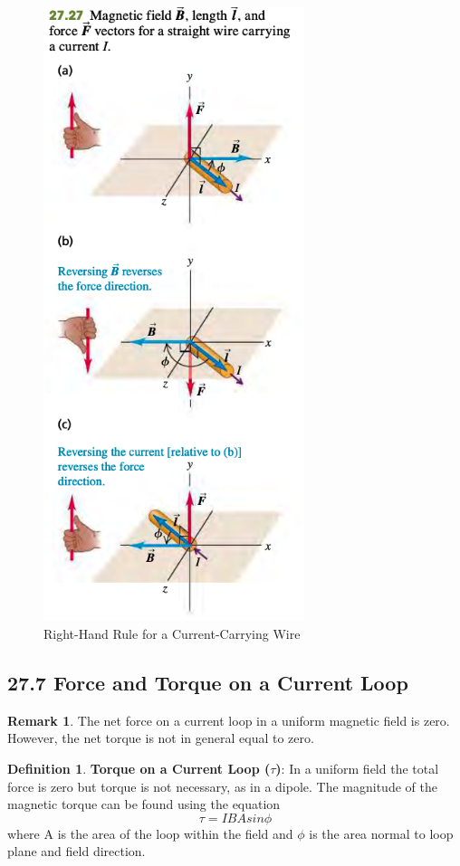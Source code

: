 \documentclass[12pt]{amsart}
\theoremstyle{definition}
\newtheorem{definition}{Definition} %
\newtheorem*{remark}{Remark}        %
\numberwithin{equation}{theorem}    %
\begin{document}
\begin{figure}[H]
    \centering
    \includegraphics[width=3in]{Media/wirerhr.png}
    \caption{Right-Hand Rule for a Current-Carrying Wire}
    \label{Right-Hand Rule for a Current-Carrying Wire}
\end{figure}

\subsection*{27.7 Force and Torque on a Current Loop}
\begin{remark}
    The net force on a current loop in a uniform magnetic field is zero. However, the net torque is not in general equal to zero.
\end{remark}

\begin{definition}
    \textbf{Torque on a Current Loop ($\tau$)}:
    In a uniform field the total force is zero but torque is not necessary, as in a dipole. The magnitude of the magnetic torque can be found using the equation $$\tau = IBAsin\phi$$ where A is the area of the loop within the field and $\phi$ is the area normal to loop plane and field direction.
\end{definition}
\end{document}
